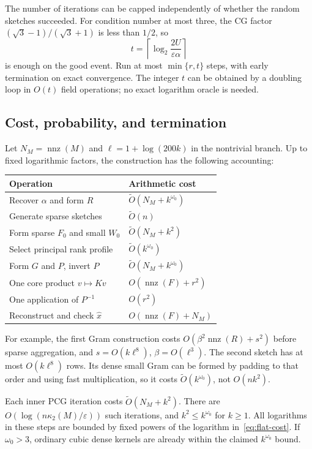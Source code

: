 \documentclass[11pt,a4paper]{article}
\newcommand{\nnz}{\operatorname{nnz}}
\newcommand{\softO}{\widetilde O}
\newcommand{\cond}{\kappa_2}
\newcommand{\eps}{\varepsilon}
\theoremstyle{definition}
\theoremstyle{remark}
\begin{document}
The number of iterations can be capped independently of whether the random sketches succeeded. For condition number at most three, the CG factor
$(\sqrt3-1)/(\sqrt3+1)$ is less than $1/2$, so
\[
 t=\left\lceil\log_2\frac{2U}{\eps\alpha}\right\rceil
\]
is enough on the good event. Run at most $\min\{r,t\}$ steps, with early termination on exact convergence. The integer $t$ can be obtained by a doubling loop in $O(t)$ field operations; no exact logarithm oracle is needed.

\subsection{Cost, probability, and termination}
Let $N_M=\nnz(M)$ and $\ell=1+\log(200k)$ in the nontrivial branch. Up to fixed logarithmic factors, the construction has the following accounting:
\begin{center}
\begin{tabular}{p{}p{}}
\toprule
Operation & Arithmetic cost\\
\midrule
Recover $\alpha$ and form $R$ & $\softO(N_M+k^{\omega_0})$\\
Generate sparse sketches & $\softO(n)$\\
Form sparse $F_0$ and small $W_0$ & $\softO(N_M+k^2)$\\
Select principal rank profile & $\softO(k^{\omega_0})$\\
Form $G$ and $P$, invert $P$ & $\softO(N_M+k^{\omega_0})$\\
One core product $v\mapsto Kv$ & $O(\nnz(F)+r^2)$\\
One application of $P^{-1}$ & $O(r^2)$\\
Reconstruct and check $\widehat x$ & $O(\nnz(F)+N_M)$\\
\bottomrule
\end{tabular}
\end{center}
For example, the first Gram construction costs $O(\beta^2\nnz(R)+s^2)$ before sparse aggregation, and $s=O(k\ell^8)$, $\beta=O(\ell^3)$. The second sketch has at most $O(k\ell^8)$ rows. Its dense small Gram can be formed by padding to that order and using fast multiplication, so it costs $\softO(k^{\omega_0})$, not $O(nk^2)$.

Each inner PCG iteration costs $\softO(N_M+k^2)$. There are $O(\log(n\cond(M)/\eps))$ such iterations, and $k^2\le k^{\omega_0}$ for $k\ge1$. All logarithms in these steps are bounded by fixed powers of the logarithm in~\eqref{eq:flat-cost}. If $\omega_0>3$, ordinary cubic dense kernels are already within the claimed $k^{\omega_0}$ bound.
\end{document}
